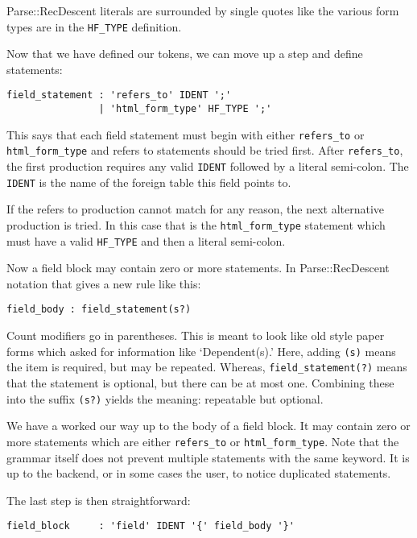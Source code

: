 Parse::RecDescent literals are surrounded by single quotes like the various
form types are in the \verb+HF_TYPE+ definition.

Now that we have defined our tokens, we can move up a step and define
statements:

\begin{verbatim}
field_statement : 'refers_to' IDENT ';'
                | 'html_form_type' HF_TYPE ';'
\end{verbatim}

This says that each field statement must begin with either \verb+refers_to+
or \verb+html_form_type+ and refers to statements should be tried first.
After \verb+refers_to+, the first production requires any valid \verb+IDENT+
followed by a literal semi-colon.  The \verb+IDENT+ is the name of the
foreign table this field points to.

If the refers to production cannot match for any reason, the next
alternative production is tried.  In this case that is the
\verb+html_form_type+ statement which must have a valid \verb+HF_TYPE+
and then a literal semi-colon.

Now a field block may contain zero or more statements.  In Parse::RecDescent
notation that gives a new rule like this:

\begin{verbatim}
field_body : field_statement(s?)
\end{verbatim}

Count modifiers go in parentheses.  This is meant to look like
old style paper forms which asked for information like `Dependent(s).'  Here,
adding \verb+(s)+ means the item is required, but may be repeated.  Whereas,
\verb+field_statement(?)+ means that the statement is optional, but
there can be at most one.  Combining these into the suffix \verb+(s?)+
yields the meaning: repeatable but optional.

We have a worked our way up to the body of a field block.  It
may contain zero or more statements which are either \verb+refers_to+
or \verb+html_form_type+.  Note that the grammar itself does not prevent
multiple statements with the same keyword.  It is up to the backend, or
in some cases the user, to notice duplicated statements.

The last step is then straightforward:

\begin{verbatim}
field_block     : 'field' IDENT '{' field_body '}'
\end{verbatim}

